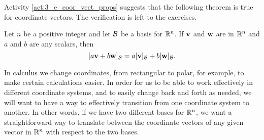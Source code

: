 Activity \ref{act:3_e_coor_vect_props} suggests that the following theorem is true for coordinate vectors. The verification is left to the exercises.

\begin{theorem} \label{thm:3_e_coord_vector} Let $n$ be a positive integer and let $\mathcal{B}$ be a basis for $\mathbb{R}^n$. If $\mathbf{v}$ and $\mathbf{w}$ are in $\mathbb{R}^n$ and $a$ and $b$ are any scalars, then 
\[[a\mathbf{v}+b\mathbf{w}]_{\mathcal{B}} = a[\mathbf{v}]_{\mathcal{B}} + b[\mathbf{w}]_{\mathcal{B}}.\]
\end{theorem} 



In calculus we change coordinates, from rectangular to polar, for example, to make certain calculations easier. In order for us to be able to work effectively in different coordinate systems, and to easily change back and forth as needed, we will want to have a way to effectively transition from one coordinate system to another. In other words, if we have two different bases for $\mathbb{R}^n$, we want a straightforward way to translate between the coordinate vectors of any given vector in $\mathbb{R}^n$ with respect to the two bases. 


